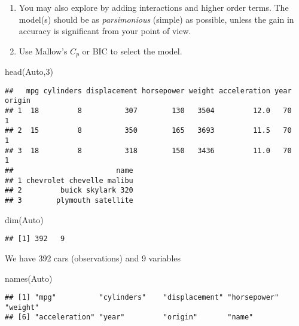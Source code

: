 \documentclass[
]{article}
\newenvironment{Shaded}{\begin{snugshade}}{\end{snugshade}}
\newcommand{\DecValTok}[1]{\textcolor[rgb]{0.00,0.00,0.81}{#1}}
\newcommand{\FunctionTok}[1]{\textcolor[rgb]{0.00,0.00,0.00}{#1}}
\newcommand{\NormalTok}[1]{#1}
\begin{document}
\begin{enumerate}
\def\labelenumi{\alph{enumi})}
\setcounter{enumi}{1}
\item
  You may also explore by adding interactions and higher order terms.
  The model(s) should be as \emph{parsimonious} (simple) as possible,
  unless the gain in accuracy is significant from your point of view.
\item
  Use Mallow's \(C_p\) or BIC to select the model.
\end{enumerate}

\begin{Shaded}
\begin{Highlighting}[]
\FunctionTok{head}\NormalTok{(Auto,}\DecValTok{3}\NormalTok{)}
\end{Highlighting}
\end{Shaded}

\begin{verbatim}
##   mpg cylinders displacement horsepower weight acceleration year origin
## 1  18         8          307        130   3504         12.0   70      1
## 2  15         8          350        165   3693         11.5   70      1
## 3  18         8          318        150   3436         11.0   70      1
##                        name
## 1 chevrolet chevelle malibu
## 2         buick skylark 320
## 3        plymouth satellite
\end{verbatim}

\begin{Shaded}
\begin{Highlighting}[]
\FunctionTok{dim}\NormalTok{(Auto)}
\end{Highlighting}
\end{Shaded}

\begin{verbatim}
## [1] 392   9
\end{verbatim}

We have 392 cars (observations) and 9 variables

\begin{Shaded}
\begin{Highlighting}[]
\FunctionTok{names}\NormalTok{(Auto)}
\end{Highlighting}
\end{Shaded}

\begin{verbatim}
## [1] "mpg"          "cylinders"    "displacement" "horsepower"   "weight"      
## [6] "acceleration" "year"         "origin"       "name"
\end{verbatim}
\end{document}
